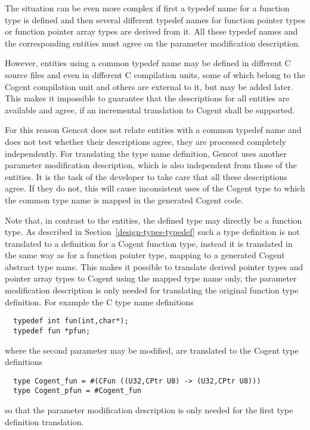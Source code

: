 The situation can be even more complex if first a typedef name for a function type is defined and then several
different typedef names for function pointer types or function pointer array types are derived from it. All
these typedef names and the corresponding entities must agree on the parameter modification description.

However, entities using a common typedef name may be defined in different C source files and even in different
C compilation units, some of which belong to the Cogent compilation unit and others are external to it, but may
be added later. This makes it impossible to guarantee that the descriptions for all entities are available
and agree, if an incremental translation to Cogent shall be supported.

For this reason Gencot does not relate entities with a common typedef name and does not test whether their
descriptions agree, they are processed completely independently. For translating the type name definition,
Gencot uses another parameter modification description, which is also independent from those of the entities.
It is the task of the developer to take care that all these descriptions agree. If they do not, this will 
cause inconsistent uses of the Cogent type to which the common type name is mapped in the generated Cogent code.

Note that, in contrast to the entities, the defined type may directly be a function type. As described in 
Section~\ref{design-types-typedef} such a type definition is not translated to a definition for a Cogent function
type, instead it is translated in the same way as for a function pointer type, mapping to a generated Cogent
abstract type name. This makes it possible to translate derived pointer types and pointer array types to 
Cogent using the mapped type name only, the parameter modification description is only needed for translating
the original function type definition. For example the C type name definitions
\begin{verbatim}
  typedef int fun(int,char*);
  typedef fun *pfun;
\end{verbatim}
where the second parameter may be modified, are translated to the Cogent type definitions
\begin{verbatim}
  type Cogent_fun = #(CFun ((U32,CPtr U8) -> (U32,CPtr U8)))
  type Cogent_pfun = #Cogent_fun
\end{verbatim}
so that the parameter modification description is only needed for the first type definition translation.

